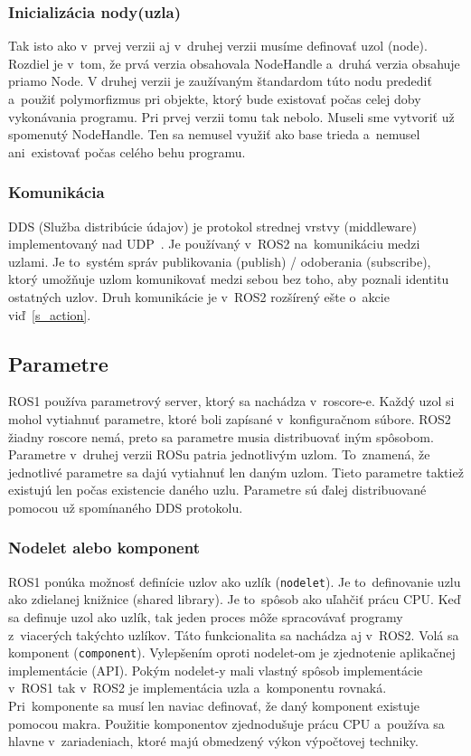 \subsubsection{Inicializácia nody(uzla)}

	Tak isto ako v~prvej verzii aj v~druhej verzii musíme definovať uzol (node). Rozdiel je v~tom, že prvá verzia obsahovala NodeHandle a~druhá
	verzia obsahuje priamo Node. V druhej verzii je zaužívaným štandardom túto nodu predediť a~použiť polymorfizmus pri objekte, ktorý bude
	existovať počas celej doby vykonávania programu. Pri prvej verzii tomu tak nebolo. Museli sme vytvoriť už spomenutý NodeHandle. Ten sa nemusel
	využiť ako base trieda a~nemusel ani~existovať počas celého behu programu.

\subsubsection{Komunikácia}

	DDS (Služba distribúcie údajov) je protokol strednej vrstvy (middleware) implementovaný nad UDP~\cite{ROS2book}. Je používaný v~ROS2
	na~komunikáciu medzi uzlami. Je to~systém správ publikovania (publish) / odoberania (subscribe), ktorý umožňuje uzlom komunikovať medzi
	sebou bez toho, aby poznali identitu ostatných uzlov. Druh komunikácie je v~ROS2 rozšírený ešte o~akcie viď~\ref{s_action}.

\subsection{Parametre}

	ROS1 používa parametrový server, ktorý sa nachádza v~roscore-e. Každý uzol si mohol vytiahnuť parametre, ktoré boli zapísané v~konfiguračnom
	súbore. ROS2 žiadny roscore nemá, preto sa parametre musia distribuovať iným spôsobom. Parametre v~druhej verzii ROSu patria jednotlivým uzlom.
	To~znamená, že jednotlivé parametre sa dajú vytiahnuť len daným uzlom. Tieto parametre taktiež existujú len počas existencie daného uzlu. Parametre
	sú ďalej distribuované pomocou už spomínaného DDS protokolu.

\subsubsection{Nodelet alebo komponent}

	ROS1 ponúka možnosť definície uzlov ako uzlík (\texttt{nodelet}). Je to~definovanie uzlu ako zdielanej knižnice (shared library). Je
	to~spôsob ako uľahčiť prácu CPU. Keď sa definuje uzol ako uzlík, tak jeden proces môže spracovávať programy z~viacerých takýchto uzlíkov.
	Táto funkcionalita sa nachádza aj v~ROS2. Volá sa komponent (\texttt{component}). Vylepšením oproti nodelet-om je zjednotenie aplikačnej
	implementácie (API). Pokým nodelet-y mali vlastný spôsob implementácie v~ROS1 tak v~ROS2 je implementácia uzla a~komponentu rovnaká.
	Pri~komponente sa musí len naviac definovať, že daný komponent existuje pomocou makra. Použitie komponentov zjednodušuje prácu CPU
	a~používa sa hlavne v~zariadeniach, ktoré majú obmedzený výkon výpočtovej techniky.

